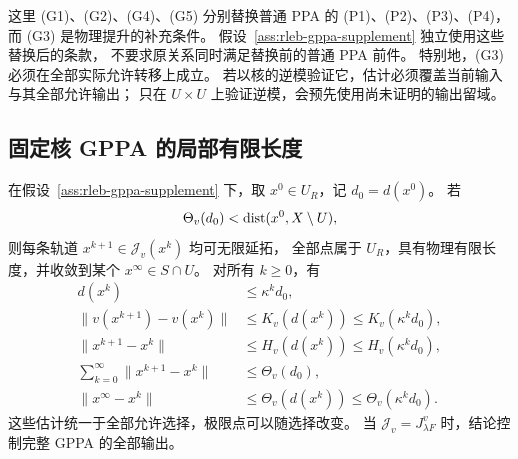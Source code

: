 这里 (G1)、(G2)、(G4)、(G5) 分别替换普通 PPA 的
(P1)、(P2)、(P3)、(P4)，而 (G3) 是物理提升的补充条件。
假设~\ref{ass:rleb-gppa-supplement} 独立使用这些替换后的条款，
不要求原关系同时满足替换前的普通 PPA 前件。
特别地，(G3) 必须在全部实际允许转移上成立。
若以核的逆模验证它，估计必须覆盖当前输入与其全部允许输出；
只在 $U\times U$ 上验证逆模，会预先使用尚未证明的输出留域。

\subsection{固定核 GPPA 的局部有限长度}

\begin{theorem}[物理空间中的局部收敛]
\label{thm:rleb-gppa-physical}
在假设~\ref{ass:rleb-gppa-supplement} 下，取 $x^0\in U_R$，记 $d_0=d(x^0)$。
若
\begin{equation}
\label{eq:gppa-physical-budget}
 \Theta_v(d_0)<\operatorname{dist}(x^0,X\setminus U),
\end{equation}
则每条轨道 $x^{k+1}\in\mathcal J_v(x^k)$ 均可无限延拓，
全部点属于 $U_R$，具有物理有限长度，并收敛到某个 $x^\infty\in S\cap U$。
对所有 $k\ge0$，有
\begin{align}
 d(x^k)&\le\kappa^kd_0,\label{eq:gppa-physical-distance}\\
 \|v(x^{k+1})-v(x^k)\|&\le K_v(d(x^k))\le K_v(\kappa^kd_0),\\
 \|x^{k+1}-x^k\|&\le H_v(d(x^k))\le H_v(\kappa^kd_0),\\
 \sum_{k=0}^{\infty}\|x^{k+1}-x^k\|&\le\Theta_v(d_0),\\
 \|x^\infty-x^k\|&\le\Theta_v(d(x^k))\le\Theta_v(\kappa^kd_0).
 \label{eq:gppa-physical-tail}
\end{align}
这些估计统一于全部允许选择，极限点可以随选择改变。
当 $\mathcal J_v=J^v_{\lambda F}$ 时，结论控制完整 GPPA 的全部输出。
\end{theorem}

